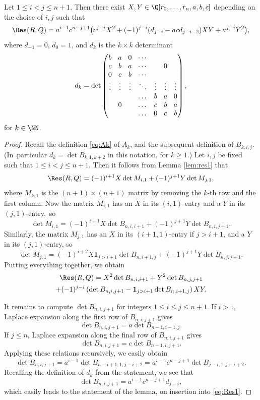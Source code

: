 \begin{lemma}\label{lem:res2}
Let $1\leq i<j\leq n+1$.
Then there exist $X,Y\in\Q[r_0,\dots, r_n,a,b,c]$ depending on the choice of $i,j$ such that
\[
\Res(R,Q)
=a^{i-1}c^{n-j+1}\bigl(c^{j-i}X^2+(-1)^{j-i}(d_{j-i}-acd_{j-i-2})XY+a^{j-i}Y^2\bigr),
\]
where
$d_{-1}=0$, $d_0=1$, and $d_k$ is the $k\times k$ determinant
\[\arraycolsep4.5pt
d_k=\det
\begin{pmatrix}
b & a & 0& \cdots & & & \\
c & b& a& \cdots & & 0&\\
0 & c& b& \cdots & & & \\
\vdots & \vdots &\vdots & \ddots &\vdots &\vdots &\vdots \\
& & & \dots& b& a& 0\\
& 0 & &\dots& c& b& a\\
& & &\dots & 0& c& b
\end{pmatrix},
\]
for $k\in \NN$.
\end{lemma}

\begin{proof}
Recall the definition \eqref{eq:Ak} of $A_k$,
and the subsequent definition of $B_{k,i,j}$.
(In~particular $d_k=\det B_{k,1,k+2}$ in this notation, for $k\geq 1$.)
Let $i,j$ be fixed such that $1\leq i<j\leq n+1$. Then
it follows from Lemma \ref{lem:res1} that
\[
\Res(R,Q)=(-1)^{i+1}X\det M_{i,1}+(-1)^{j+1}Y\det M_{j,1},
\]
where $M_{k,1}$ is the $(n+1)\times(n+1)$ matrix by removing the $k$-th row and the first column.
Now the matrix $M_{i,1}$ has an $X$ in its $(i,1)$-entry and a $Y$ in its $(j,1)$-entry,~so
\[
\det M_{i,1}=(-1)^{i+1}X\det B_{n,i,i+1}+(-1)^{j+1}Y\det B_{n,i,j+1}.
\]
Similarly,
the matrix $M_{j,1}$ has an $X$ in its $(i+1,1)$-entry if $j>i+1$, and a $Y$ in its $(j,1)$-entry, so
\[
\det M_{j,1}=(-1)^{i+2}X\mathbf{1}_{j> i+1}\det B_{n,i+1,j}+(-1)^{j+1} Y\det B_{n,j,j+1}.
\]
Putting everything together, we obtain
\begin{multline}\label{eq:Res1}
\Res(R,Q)
=
X^2\det B_{n,i,i+1}
+Y^2 \det B_{n,j,j+1}\\
+(-1)^{j-i}\left(\det B_{n,i,j+1}-\mathbf{1}_{j> i+1}\det B_{n,i+1,j}\right)XY.
\end{multline}

It remains to compute $\det B_{n,i,j+1}$ for
integers $1\leq i\leq j\leq n+1$.
If $i>1$, Laplace expansion along the first row of $B_{n,i,j+1}$ gives
\[
\det B_{n,i,j+1}=a\det B_{n-1,i-1,j}.
\]
If $j\leq n$, Laplace expansion along the final row of $B_{n,i,j+1}$ gives
\[
\det B_{n,i,j+1}=c\det B_{n-1,i,j+1}.
\]
Applying these relations recursively, we easily obtain
\[
\det B_{n,i,j+1}
=a^{i-1}\det B_{n-i+1,1,j-i+2}
=a^{i-1}c^{n-j+1}
\det B_{j-i,1,j-i+2}.
\]
Recalling the definition of $d_k$ from the statement,
we see that
\[
\det B_{n,i,j+1}=a^{i-1}c^{n-j+1}d_{j-i},
\]
which easily leads to the statement of the lemma, on insertion into \eqref{eq:Res1}.
\end{proof}


